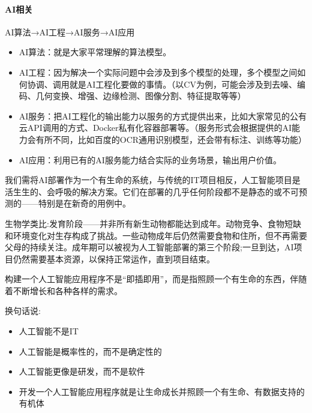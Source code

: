 \documentclass[letterpaper,10pt,english]{sphinxmanual}
\begin{document}
\paragraph{AI相关}
\label{\detokenize{chapter_knowledge/project_manage:ai}}
AI算法→AI工程→AI服务→AI应用
%
\begin{footnote}[658]\sphinxAtStartFootnote
{}
%
\end{footnote}
\begin{itemize}
\item {} 
AI算法：就是大家平常理解的算法模型。

\item {} 
AI工程：因为解决一个实际问题中会涉及到多个模型的处理，多个模型之间如何协调、调用就是AI工程化要做的事情。（以CV为例，可能会涉及到去噪、编码、几何变换、增强、边缘检测、图像分割、特征提取等等）

\item {} 
AI服务：把AI工程化的输出能力以服务的方式提供出来，比如大家常见的公有云API调用的方式、Docker私有化容器部署等。（服务形式会根据提供的AI能力会有所不同，比如百度的OCR通用识别模型，还会带有标注、训练等功能）

\item {} 
AI应用：利用已有的AI服务能力结合实际的业务场景，输出用户价值。

\end{itemize}

我们需将AI部署作为一个有生命的系统，与传统的IT项目相反，人工智能项目是活生生的、会呼吸的解决方案。它们在部署的几乎任何阶段都不是静态的或不可预测的——特别是在新奇的用例中。%
\begin{footnote}[659]\sphinxAtStartFootnote
{}
%
\end{footnote}

生物学类比:发育阶段——并非所有新生动物都能达到成年。动物竞争、食物短缺和环境变化对生存构成了挑战。一些动物成年后仍然需要食物和住所，但不再需要父母的持续关注。成年期可以被视为人工智能部署的第三个阶段;一旦到达，AI项目仍然需要基本资源，以保持正常运作，直到项目结束。

构建一个人工智能应用程序不是“即插即用”，而是指照顾一个有生命的东西，伴随着不断增长和各种各样的需求。

换句话说:
\begin{itemize}
\item {} 
人工智能不是IT

\item {} 
人工智能是概率性的，而不是确定性的

\item {} 
人工智能更像是研发，而不是软件

\item {} 
开发一个人工智能应用程序就是让生命成长并照顾一个有生命、有数据支持的有机体

\end{itemize}
\end{document}
